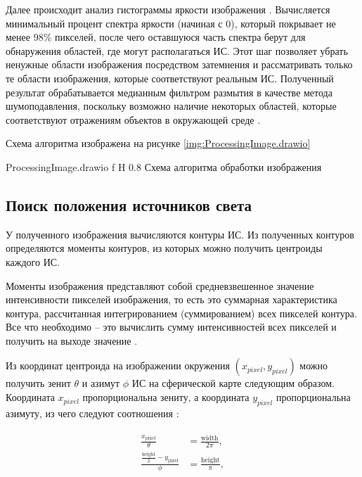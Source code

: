 Далее происходит анализ гистограммы яркости изображения \cite{img_hists}. Вычисляется минимальный процент спектра яркости (начиная с 0), который покрывает не менее 98\% пикселей, после чего оставшуюся часть спектра берут для обнаружения областей, где могут располагаться ИС. Этот шаг позволяет убрать ненужные области изображения посредством затемнения и рассматривать только те области изображения, которые соответствуют реальным ИС. Полученный результат обрабатывается медианным фильтром размытия в качестве метода шумоподавления, поскольку возможно наличие некоторых областей, которые соответствуют отражениям объектов в окружающей среде \cite{osti2019real}.

Схема алгоритма изображена на рисунке \ref{img:ProcessingImage.drawio}

{ProcessingImage.drawio}
{f}
{H}
{0.8\textwidth}
{Схема алгоритма обработки изображения}

\subsection{Поиск положения источников света}

У полученного изображения вычисляются контуры ИС. Из полученных контуров определяются моменты контуров, из которых можно получить центроиды каждого ИС. 

Моменты изображения представляют собой средневзвешенное значение интенсивности пикселей изображения, то есть это суммарная характеристика контура, рассчитанная интегрированием (суммированием) всех пикселей контура. Все что необходимо -- это вычислить сумму интенсивностей всех пикселей и получить на выходе значение \cite{sns_tras}.

Из координат центроида на изображении окружения $(x_{pixel}, y_{pixel})$ можно получить зенит $\theta$ и азимут $\phi$ ИС на сферической карте следующим образом. Координата $x_{pixel}$ пропорциональна зениту, а координата $y_{pixel}$ пропорциональна азимуту, из чего следуют соотношения \cite{osti2019real}:

\begin{equation}
	\begin{aligned}
		\begin{split}
			\frac{x_{\text{pixel}}}{\theta} &= \frac{\text{width}}{2\pi}, \\
			\frac{\frac{\text{height}}{2} - y_{\text{pixel}}}{\phi} &= \frac{\text{height}}{\pi}, 
		\end{split}
	\end{aligned}
\end{equation}

